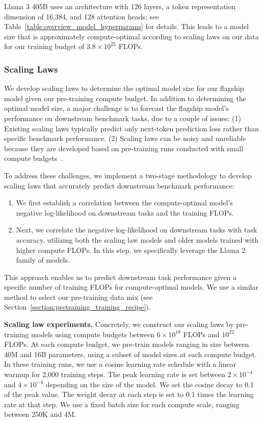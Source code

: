 \documentclass[dvipsnames]{fairmeta}
\begin{document}
Llama 3 405B uses an architecture with 126 layers, a token representation dimension of 16,384, and 128 attention heads; see Table~\ref{table:overview_model_hyperparams} for details.
This leads to a model size that is approximately compute-optimal according to scaling laws on our data for our training budget of $3.8 \times 10^{25}$ FLOPs.

\subsubsection{Scaling Laws}
\label{section:scaling_law}

We develop scaling laws \citep{hoffmann2022chinchilla,kaplan2020scaling} to determine the optimal model size for our flagship model given our pre-training compute budget.
In addition to determining the optimal model size, a major challenge is to forecast the flagship model's performance on downstream benchmark tasks, due to a couple of issues: (1) Existing scaling laws typically predict only next-token prediction loss rather than specific benchmark performance.
(2)  Scaling laws can be noisy and unreliable because they are developed based on pre-training runs conducted with small compute budgets~\citep{wei2022emergent}.

To address these challenges, we implement a two-stage methodology to develop scaling laws that accurately predict downstream benchmark performance:
\begin{enumerate}
    \item We first establish a correlation between the compute-optimal model's negative log-likelihood on downstream tasks and the training FLOPs.
    \item Next, we correlate the negative log-likelihood on downstream tasks with task accuracy, utilizing both the scaling law models and older models trained with higher compute FLOPs. In this step, we specifically leverage the Llama 2 family of models.
\end{enumerate}
This approach enables us to predict downstream task performance given a specific number of training FLOPs for compute-optimal models.
We use a similar method to select our pre-training data mix (see Section~\ref{section:pretraining_training_recipe}).

\textbf{Scaling law experiments.}
Concretely, we construct our scaling laws by pre-training models using compute budgets between $6 \times 10^{18}$ FLOPs and $10^{22}$ FLOPs.
At each compute budget, we pre-train models ranging in size between 40M and 16B parameters, using a subset of model sizes at each compute budget.
In these training runs, we use a cosine learning rate schedule with a linear warmup for 2,000 training steps.
The peak learning rate is set between $2 \times 10^{-4}$ and $4 \times 10^{-4}$ depending on the size of the model.
We set the cosine decay to 0.1 of the peak value.
The weight decay at each step is set to 0.1 times the learning rate at that step.
We use a fixed batch size for each compute scale, ranging between 250K and 4M.
\end{document}
